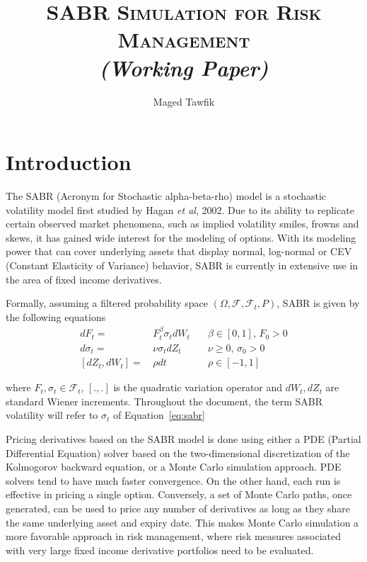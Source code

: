 \documentclass[12pt,oneside]{article}
\title{
  \textsc{SABR Simulation for Risk Management}\\%
  \large{\em{(Working Paper)}}
}
\author{Maged Tawfik%
}
\let\oin\in
\renewcommand{\in}{\!\oin\!}
\numberwithin{equation}{section}
\begin{document}
\pagestyle{fancy}

\maketitle
\thispagestyle{fpstyle} %
\begin{center}
\end{center}
%
\section{Introduction}
The SABR (Acronym for Stochastic alpha-beta-rho) model is a stochastic volatility model
first studied by Hagan {\em et al}, 2002\cite{HKLW}.
Due to its ability to replicate certain observed market phenomena, such as
implied volatility smiles, frowns and skews, it has gained wide interest
for the modeling of options.
With its modeling power that can cover underlying assets that display normal, log-normal
or CEV (Constant Elasticity of Variance) behavior,
SABR is currently in extensive use in the area of fixed income derivatives.

Formally, assuming a filtered probability space $(\Omega,\mathcal{F},\mathcal{F}_t,P)$,
SABR is given by the following equations
\begin{subequations}\label{eq:sabr}
    \begin{align}
        dF_t=\,&F_{t}^{\beta} \sigma_t dW_t\quad&\beta\in[0,1],\,F_0>0\label{eq:sabr_a}\\
        d\sigma_t =\,&\nu \sigma_t dZ_t&\nu\ge 0,\,\sigma_0>0\label{eq:sabr_b}\\
        [dZ_t,dW_t] =\,& \rho dt&\rho \in[-1,1]
    \end{align}
\end{subequations}

where $F_t, \sigma_t\in\mathcal{F}_t$, $[.,.]$ is the quadratic variation operator and
$dW_t, dZ_t$ are standard Wiener increments.
Throughout the document, the term SABR volatility will refer to $\sigma_t$ of
Equation~\eqref{eq:sabr}

Pricing derivatives based on the SABR model is done using either a PDE (Partial Differential Equation)
solver based on the two-dimensional discretization of the Kolmogorov backward equation,
or a Monte Carlo simulation approach.
PDE solvers tend to have much faster convergence.
On the other hand, each run is effective in pricing a single option.
Conversely, a set of Monte Carlo paths, once generated, can be used to price any number of
derivatives as long as they share the same underlying asset and expiry date.
This makes Monte Carlo simulation a more favorable approach in risk management,
where risk measures associated with very large fixed income derivative portfolios need
to be evaluated.
\end{document}
